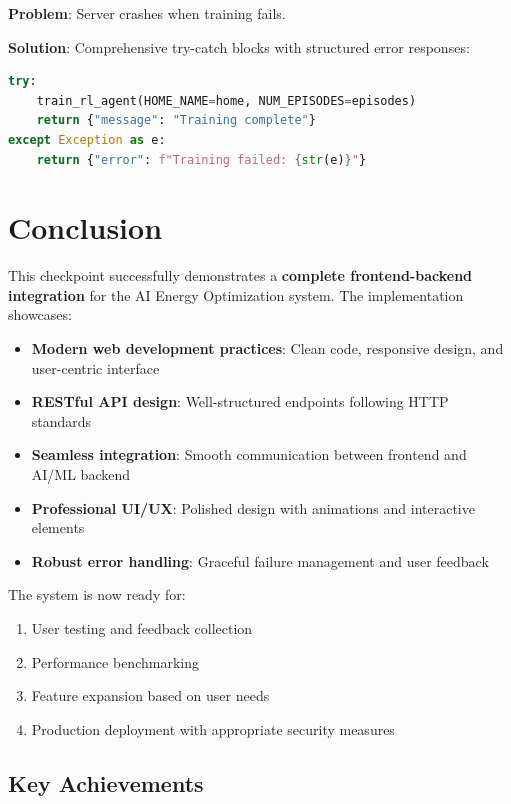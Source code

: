 \documentclass[12pt,a4paper]{article}
\begin{document}
\textbf{Problem}: Server crashes when training fails.

\textbf{Solution}: Comprehensive try-catch blocks with structured error responses:
\begin{lstlisting}[language=Python]
try:
    train_rl_agent(HOME_NAME=home, NUM_EPISODES=episodes)
    return {"message": "Training complete"}
except Exception as e:
    return {"error": f"Training failed: {str(e)}"}
\end{lstlisting}

\section{Conclusion}

This checkpoint successfully demonstrates a \textbf{complete frontend-backend integration} for the AI Energy Optimization system. The implementation showcases:

\begin{itemize}[leftmargin=*]
    \item \textbf{Modern web development practices}: Clean code, responsive design, and user-centric interface
    \item \textbf{RESTful API design}: Well-structured endpoints following HTTP standards
    \item \textbf{Seamless integration}: Smooth communication between frontend and AI/ML backend
    \item \textbf{Professional UI/UX}: Polished design with animations and interactive elements
    \item \textbf{Robust error handling}: Graceful failure management and user feedback
\end{itemize}

The system is now ready for:
\begin{enumerate}[leftmargin=*]
    \item User testing and feedback collection
    \item Performance benchmarking
    \item Feature expansion based on user needs
    \item Production deployment with appropriate security measures
\end{enumerate}

\subsection{Key Achievements}
\end{document}
